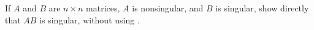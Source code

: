 If $A$ and $B$ are $n \times n$ matrices, $A$ is nonsingular, and $B$ is singular, show directly that $AB$ is singular, without using .